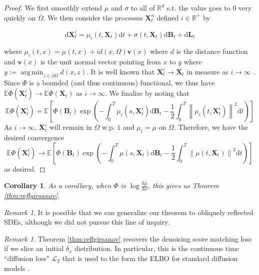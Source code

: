 \documentclass{article}
\theoremstyle{plain}
\newtheorem{corollary}[theorem]{Corollary}
\theoremstyle{definition}
\theoremstyle{remark}
\newtheorem{remark}[theorem]{Remark}
\DeclareMathOperator*{\argmin}{arg\,min}
\newcommand{\R}{\mathbb{R}}
\newcommand{\E}{\mathbb{E}}
\newcommand{\paren}[1]{\left(#1\right)}
\newcommand{\sqbrac}[1]{\left[#1\right]}
\newcommand{\norm}[1]{\left\|#1\right\|}
\renewcommand{\vec}{\mathbf}
\newcommand{\dd}{\mathrm{d}}
\begin{document}
\begin{proof}
   We first smoothly extend $\mu$ and $\sigma$ to all of $\R^d$ s.t. the value goes to $0$ very quickly on $\overline{\Omega}$. We then consider the processes $\vec{X}_t^n$ defined $i \in \R^+$ by

    \begin{equation}
        \dd \vec{X}_t^i = \mu_i(t, \vec{X}_t) \dd t + \sigma(t, \vec{X}_t) \dd \vec{B}_t + \dd \vec{L}_t
    \end{equation}

    where $\mu_i(t, x) = \mu(t, x) + i d(x, \Omega) \vec{v}(x)$ where $d$ is the distance function and $\vec{v}(x)$ is the unit normal vector pointing from $x$ to $y$ where $y := \argmin_{z \in \partial \Omega} d(x, z)$. It is well known that $\vec{X}_t^i \to \vec{X}_t$ in measure as $i \to \infty$ \citep{Liu1993NumericalAT}. Since $\Phi$ is a bounded (and thus continuous) functional, we thus have $\E \Phi(\vec{X}_t^i) \to \E \Phi(\vec{X}_t)$ as $i \to \infty$. We finalize by noting that
    \begin{equation}\label{eqn:app:igirs}
        \E \Phi(\vec{X}_t^i) = \E \sqbrac{\Phi(\vec{B}_t) \exp\paren{-\int_0^T \mu_i(s, \vec{X}_t^i) \dd\vec{B}_t - \frac{1}{2} \int_0^T \norm{\mu_i(t, \vec{X}_t^i)}^2 \dd t}}
    \end{equation}
    As $i \to \infty$, $\vec{X}_t^i$ will remain in $\Omega$ w.p. $1$ and $\mu_i = \mu$ on $\Omega$. Therefore, we have the desired convergence
    \begin{equation}
        \E \Phi(\vec{X}_t^i) \to \E \sqbrac{\Phi(\vec{B}_t) \exp\paren{-\int_0^T \mu(s, \vec{X}_t) \dd\vec{B}_t - \frac{1}{2} \int_0^T \norm{\mu(t, \vec{X}_t)}^2 \dd t}}
    \end{equation}
    as desired.
\end{proof}
\begin{corollary}
    As a corollary, when $\Phi$ is $\log \frac{\dd \mu}{\dd \nu}$, this gives us Theorem \ref{thm:reflgirsanov}.
\end{corollary}

\begin{remark}
    It is possible that we can generalize our theorem to obliquely reflected SDEs, although we did not pursue this line of inquiry.
\end{remark}

\begin{remark}
    Theorem \ref{thm:reflgirsanov} recovers the denoising score matching loss if we slice an initial $\delta_x$ distribution. In particular, this is the continuous time ``diffusion loss" $\mathcal{L}_T$ that is used to the form the ELBO for standard diffusion models  \citep{Kingma2021VariationalDM, Ho2020DenoisingDP}.
\end{remark}
\end{document}
